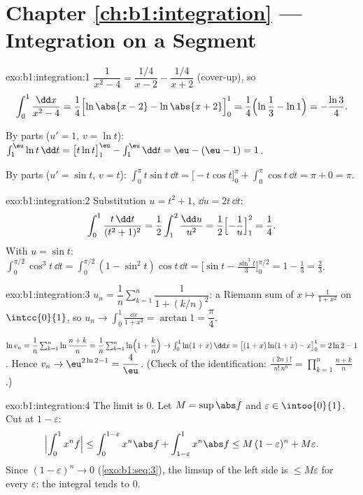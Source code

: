 \section*{Chapter \ref{ch:b1:integration} --- Integration on a Segment}

\begin{solution}{exo:b1:integration:1}
$\dfrac{1}{x^2-4} = \dfrac{1/4}{x - 2} - \dfrac{1/4}{x+2}$
(cover-up), so
\[
\int_0^1 \frac{\dd x}{x^2 - 4}
= \frac14\Bigl[\ln\abs{x-2} - \ln\abs{x+2}\Bigr]_0^1
= \frac14\Bigl(\ln\frac{1}{3} - \ln 1\Bigr) = -\frac{\ln 3}{4}.
\]

By parts ($u' = 1$, $v = \ln t$): $\int_1^{\eu} \ln t\,\dd t =
\bigl[t\ln t\bigr]_1^{\eu} - \int_1^{\eu} \dd t = \eu - (\eu - 1) =
1$.

By parts ($u' = \sin t$, $v = t$): $\int_0^\pi t\sin t\,\dd t =
\bigl[-t\cos t\bigr]_0^\pi + \int_0^\pi \cos t\,\dd t = \pi + 0 =
\pi$.
\end{solution}

\begin{solution}{exo:b1:integration:2}
Substitution $u = t^2 + 1$, $\dd u = 2t\,\dd t$:
\[
\int_0^1 \frac{t\,\dd t}{(t^2+1)^2}
= \frac12 \int_1^2 \frac{\dd u}{u^2}
= \frac12\Bigl[-\frac1u\Bigr]_1^2 = \frac14 .
\]
With $u = \sin t$: $\int_0^{\pi/2} \cos^3 t\,\dd t = \int_0^{\pi/2}
(1 - \sin^2 t)\cos t\,\dd t = \bigl[\sin t - \frac{\sin^3
t}{3}\bigr]_0^{\pi/2} = 1 - \frac13 = \frac23$.
\end{solution}

\begin{solution}{exo:b1:integration:3}
$u_n = \dfrac1n \sum_{k=1}^{n} \dfrac{1}{1 + (k/n)^2}$: a Riemann sum
of $x \mapsto \frac{1}{1+x^2}$ on $\intcc{0}{1}$, so $u_n \to
\int_0^1 \frac{\dd x}{1+x^2} = \arctan 1 = \dfrac\pi4$.

$\ln v_n = \dfrac1n \sum_{k=1}^{n} \ln\dfrac{n+k}{n} = \dfrac 1n
\sum_{k=1}^n \ln\Bigl(1 + \dfrac kn\Bigr) \to \int_0^1 \ln(1+x)\,\dd
x = \bigl[(1+x)\ln(1+x) - x\bigr]_0^1 = 2\ln 2 - 1$. Hence $v_n \to
\eu^{2\ln 2 - 1} = \dfrac 4\eu$. (Check of the identification:
$\frac{(2n)!}{n!\,n^n} = \prod_{k=1}^{n} \frac{n+k}{n}$.)
\end{solution}

\begin{solution}{exo:b1:integration:4}
The limit is $0$. Let $M = \sup \abs f$ and $\varepsilon \in
\intoo{0}{1}$. Cut at $1 - \varepsilon$:
\[
\Bigl| \int_0^1 x^n f \Bigr|
\leq \int_0^{1 - \varepsilon} x^n \abs f + \int_{1-\varepsilon}^1
x^n \abs f
\leq M\,(1-\varepsilon)^n + M\varepsilon .
\]
Since $(1 - \varepsilon)^n \to 0$ (\cref{exo:b1:seq:3}), the limsup
of the left side is $\leq M\varepsilon$ for every $\varepsilon$:
the integral tends to $0$.
\end{solution}

